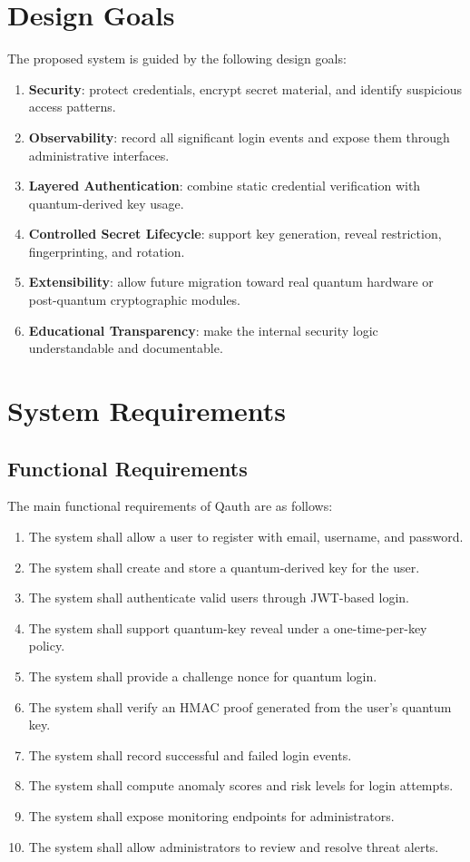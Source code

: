 \section{Design Goals}
The proposed system is guided by the following design goals:

\begin{enumerate}
    \item \textbf{Security}: protect credentials, encrypt secret material, and identify suspicious access patterns.
    \item \textbf{Observability}: record all significant login events and expose them through administrative interfaces.
    \item \textbf{Layered Authentication}: combine static credential verification with quantum-derived key usage.
    \item \textbf{Controlled Secret Lifecycle}: support key generation, reveal restriction, fingerprinting, and rotation.
    \item \textbf{Extensibility}: allow future migration toward real quantum hardware or post-quantum cryptographic modules.
    \item \textbf{Educational Transparency}: make the internal security logic understandable and documentable.
\end{enumerate}

\section{System Requirements}

\subsection{Functional Requirements}
The main functional requirements of Qauth are as follows:

\begin{enumerate}
    \item The system shall allow a user to register with email, username, and password.
    \item The system shall create and store a quantum-derived key for the user.
    \item The system shall authenticate valid users through JWT-based login.
    \item The system shall support quantum-key reveal under a one-time-per-key policy.
    \item The system shall provide a challenge nonce for quantum login.
    \item The system shall verify an HMAC proof generated from the user's quantum key.
    \item The system shall record successful and failed login events.
    \item The system shall compute anomaly scores and risk levels for login attempts.
    \item The system shall expose monitoring endpoints for administrators.
    \item The system shall allow administrators to review and resolve threat alerts.
\end{enumerate}

